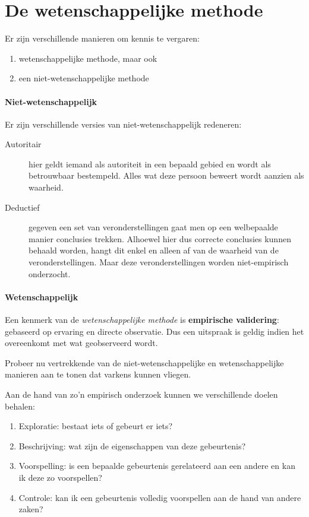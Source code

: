 \section{De wetenschappelijke methode}

Er zijn verschillende manieren om kennis te vergaren:

\begin{enumerate}
  \item wetenschappelijke methode, maar ook 
  \item een niet-wetenschappelijke methode
\end{enumerate}

\paragraph{Niet-wetenschappelijk}Er zijn verschillende versies van niet-wetenschappelijk redeneren: 
\begin{description}
  \item [Autoritair] hier geldt iemand als autoriteit in een bepaald gebied en wordt als betrouwbaar bestempeld. Alles wat deze persoon beweert wordt aanzien als waarheid. 
  \item [Deductief] gegeven een set van veronderstellingen gaat men op een welbepaalde manier conclusies trekken. Alhoewel hier dus correcte conclusies kunnen behaald worden, hangt dit enkel en alleen af van de waarheid van de veronderstellingen. Maar deze veronderstellingen worden niet-empirisch onderzocht.
\end{description}

\paragraph{Wetenschappelijk}
Een kenmerk van de \textsl{wetenschappelijke methode} is \textbf{empirische validering}: gebaseerd op ervaring en directe observatie. Dus een uitspraak is geldig indien het overeenkomt met wat geobserveerd wordt.

\begin{exercise}
Probeer nu vertrekkende van de niet-wetenschappelijke en wetenschappelijke manieren aan te tonen dat varkens kunnen vliegen. 
\end{exercise}

Aan de hand van zo'n empirisch onderzoek kunnen we verschillende doelen behalen:
\begin{enumerate}
  \item Exploratie: bestaat iets of gebeurt er iets?
  \item Beschrijving: wat zijn de eigenschappen van deze gebeurtenis?
  \item Voorspelling: is een bepaalde gebeurtenis gerelateerd aan een andere en kan ik deze zo voorspellen?
  \item Controle: kan ik een gebeurtenis volledig voorspellen aan de hand van andere zaken?
\end{enumerate}


